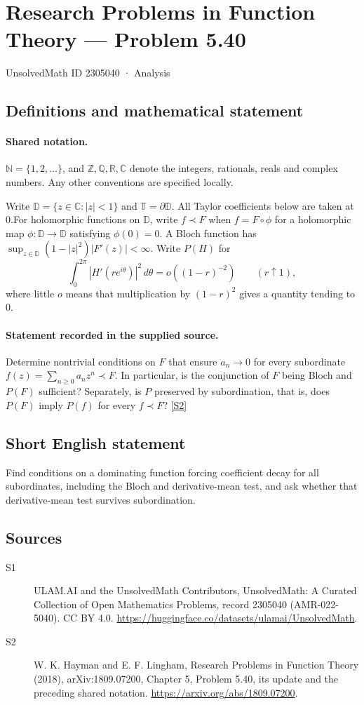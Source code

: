 \documentclass[11pt]{article}
\newcommand{\sref}[2]{\hyperlink{source:#1:#2}{[S#2]}}
\begin{document}
\setcounter{section}{2305039}
\section{Research Problems in Function Theory — Problem 5.40}\label{2305040}
{\small\sffamily UnsolvedMath ID 2305040 · Analysis}
\subsection{Definitions and mathematical statement}

\paragraph{Shared notation.}$\mathbb N=\{1,2,\ldots\}$, and $\mathbb Z,\mathbb Q,\mathbb R,\mathbb C$ denote the integers, rationals, reals and complex numbers. Any other conventions are specified locally.


Write $\mathbb D=\{z\in\mathbb C:|z|<1\}$ and $\mathbb T=\partial\mathbb D$. All Taylor coefficients below are taken at $0$.For holomorphic functions on $\mathbb D$, write $f\prec F$ when $f=F\circ\phi$ for a holomorphic map $\phi:\mathbb D\to\mathbb D$ satisfying $\phi(0)=0$. A Bloch function has $\sup_{z\in\mathbb D}(1-|z|^2)|F'(z)|<\infty$. Write $P(H)$ for
\[\int_0^{2\pi}|H'(re^{i\theta})|^2\,d\theta=o((1-r)^{-2})\qquad(r\uparrow1),\]
where little $o$ means that multiplication by $(1-r)^2$ gives a quantity tending to $0$.
\paragraph{Statement recorded in the supplied source.}
Determine nontrivial conditions on $F$ that ensure $a_n\to0$ for every subordinate $f(z)=\sum_{n\ge0}a_nz^n\prec F$. In particular, is the conjunction of $F$ being Bloch and $P(F)$ sufficient? Separately, is $P$ preserved by subordination, that is, does $P(F)$ imply $P(f)$ for every $f\prec F$? \sref{2305040}{2}
\subsection{Short English statement}
Find conditions on a dominating function forcing coefficient decay for all subordinates, including the Bloch and derivative-mean test, and ask whether that derivative-mean test survives subordination.
\subsection{Sources}
\begin{description}
\item[\hypertarget{source:2305040:1}{S1}] ULAM.AI and the UnsolvedMath Contributors, UnsolvedMath: A Curated Collection of Open Mathematics Problems, record 2305040 (AMR-022-5040). CC BY 4.0. \url{https://huggingface.co/datasets/ulamai/UnsolvedMath}.
\item[\hypertarget{source:2305040:2}{S2}] W. K. Hayman and E. F. Lingham, Research Problems in Function Theory (2018), arXiv:1809.07200, Chapter 5, Problem 5.40, its update and the preceding shared notation. \url{https://arxiv.org/abs/1809.07200}.
\end{description}
\label{end:2305040}
\end{document}
